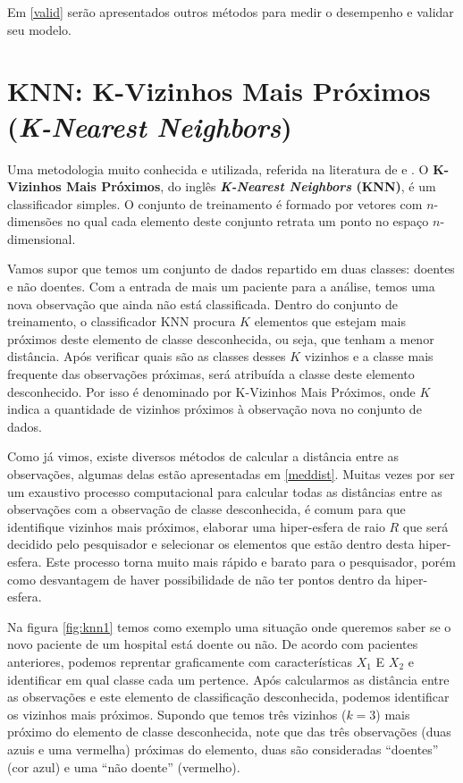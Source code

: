 \documentclass[
]{book}
\begin{document}
Em \ref{valid} serão apresentados outros métodos para medir o desempenho e validar seu modelo.

\hypertarget{knn-k-vizinhos-mais-pruxf3ximos-k-nearest-neighbors}{%
\section{\texorpdfstring{KNN: K-Vizinhos Mais Próximos (\emph{K-Nearest Neighbors})}{KNN: K-Vizinhos Mais Próximos (K-Nearest Neighbors)}}\label{knn-k-vizinhos-mais-pruxf3ximos-k-nearest-neighbors}}

Uma metodologia muito conhecida e utilizada, referida na literatura de \citep{bhattacharya1981application} e \citep{bhattacharya2005geometric}. O \textbf{K-Vizinhos Mais Próximos}, do inglês \textbf{\emph{K-Nearest Neighbors} (KNN)}, é um classificador simples. O conjunto de treinamento é formado por vetores com \(n\)-dimensões no qual cada elemento deste conjunto retrata um ponto no espaço \(n\)-dimensional.

Vamos supor que temos um conjunto de dados repartido em duas classes: doentes e não doentes. Com a entrada de mais um paciente para a análise, temos uma nova observação que ainda não está classificada. Dentro do conjunto de treinamento, o classificador KNN procura \(K\) elementos que estejam mais próximos deste elemento de classe desconhecida, ou seja, que tenham a menor distância. Após verificar quais são as classes desses \(K\) vizinhos e a classe mais frequente das observações próximas, será atribuída a classe deste elemento desconhecido. Por isso é denominado por K-Vizinhos Mais Próximos, onde \(K\) indica a quantidade de vizinhos próximos à observação nova no conjunto de dados.

Como já vimos, existe diversos métodos de calcular a distância entre as observações, algumas delas estão apresentadas em \ref{meddist}. Muitas vezes por ser um exaustivo processo computacional para calcular todas as distâncias entre as observações com a observação de classe desconhecida, é comum para que identifique vizinhos mais próximos, elaborar uma hiper-esfera de raio \(R\) que será decidido pelo pesquisador e selecionar os elementos que estão dentro desta hiper-esfera. Este processo torna muito mais rápido e barato para o pesquisador, porém como desvantagem de haver possibilidade de não ter pontos dentro da hiper-esfera.

Na figura \ref{fig:knn1} temos como exemplo uma situação onde queremos saber se o novo paciente de um hospital está doente ou não. De acordo com pacientes anteriores, podemos reprentar graficamente com características \(X_1\) E \(X_2\) e identificar em qual classe cada um pertence. Após calcularmos as distância entre as observações e este elemento de classificação desconhecida, podemos identificar os vizinhos mais próximos. Supondo que temos três vizinhos (\(k=3\)) mais próximo do elemento de classe desconhecida, note que das três observações (duas azuis e uma vermelha) próximas do elemento, duas são consideradas ``doentes'' (cor azul) e uma ``não doente'' (vermelho).
\end{document}
